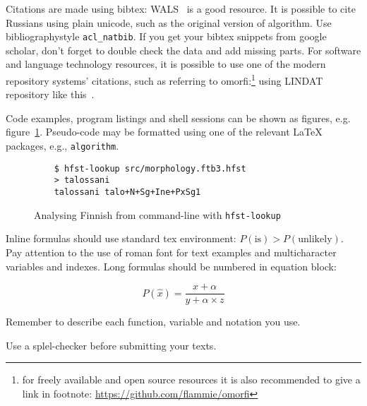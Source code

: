 \documentclass[11pt,a4paper,notitlepage]{article}
\newif\ifcameraready
\begin{document}
Citations are made using bibtex: WALS~\citep{haspelmath2005world} is a good
resource.  It is possible to cite Russians using plain unicode, such as the
original version of \citet{levenshtein1965} algorithm.  Use
bibliographystyle \texttt{acl\_natbib}. If you get your bibtex snippets from google
scholar, don't forget to double check the data and add missing parts.  For
software and language technology resources, it is possible to use one of the
modern repository systems' citations, such as referring to omorfi:\footnote{for
freely available and open source resources it is also recommended to give a link
in footnote: \url{https://github.com/flammie/omorfi}} using LINDAT repository
like this~\citep{omorfi}.

Code examples, program listings and shell sessions can be shown as figures,
e.g. figure~\ref{code:analysis}.
Pseudo-code may be formatted using one of the relevant \LaTeX{} packages, e.g.,
\texttt{algorithm}.

\begin{figure}
    \center
    \begin{verbatim}
    $ hfst-lookup src/morphology.ftb3.hfst
    > talossani
    talossani talo+N+Sg+Ine+PxSg1
    \end{verbatim}
    \caption{Analysing Finnish from command-line with \texttt{hfst-lookup}
    \label{code:analysis}}
\end{figure}

Inline formulas should use standard tex environment: $P(\mathrm{is}) >
P(\mathrm{unlikely})$. Pay attention to the use of roman font for text examples
and multicharacter variables and indexes. Long formulas should be numbered in
equation block:

\begin{equation}
    P(\hat x) = \frac{x+\alpha}{y+\alpha\times z}
\end{equation}

Remember to describe each function, variable and notation you use.

Use a splel-checker before submitting your texts.

\ifcameraready
\section*{Acknowledgments}

Acknowledgments should be un-numbered last section. Do not include
acknowledgements in anonymised review version.
\fi



\end{document}

